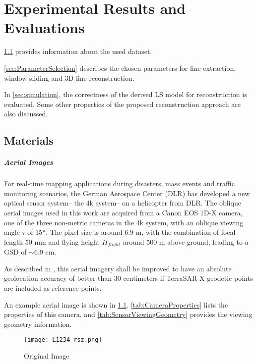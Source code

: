 \chapter{Experimental Results and Evaluations}
\label{chap:k3}

\cref{sec:Materials} provides information about the used dataset. 

\cref{sec:ParameterSelection} describes the chosen parameters for line extraction, window sliding and 3D line reconstruction. 

In \cref{sec:simulation}, the correctness of the derived LS model for reconstruction is evaluated. Some other properties of the proposed reconstruction approach are also discussed.


\clearpage
\section{Materials}
\label{sec:Materials}

\paragraph{Aerial Images}
For real-time mapping applications during disasters, mass events and traffic monitoring scenarios, the German Aerospace Center (DLR) has developed a new optical sensor system-- the 4k system-- on a helicopter from DLR. The oblique aerial images used in this work are acquired from a Canon EOS 1D-X camera, one of the three non-metric cameras in the 4k system, with an oblique viewing angle $\tau$ of 15$\degree$. The pixel size is around $6.9$ \textmu m, with the combination of focal length $50$ mm and flying height $H_{flight}$ around $500$ m above ground, leading to a GSD of $\sim$6.9 cm.

As described in \cite{Fischer2017}, this aerial imagery shall be improved to have an absolute geolocation accuracy of better than 30 centimeters if TerraSAR-X geodetic points are included as reference points.

An example aerial image is shown in \cref{fig:OriImg}. \cref{tab:CameraProperties} lists the properties of this camera, and \cref{tab:SensorViewingGeometry} provides the viewing geometry information.
\begin{figure}
	\centering
	\texttt{[image: L1234\_rsz.png]}
	\caption{\small Original Image}
	\label{fig:OriImg}
\end{figure}

